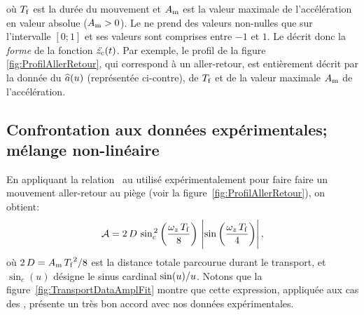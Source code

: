 où ${T_{\rm f}}$ est la durée du mouvement et $A_{\rm m}$ est la valeur maximale de l'accélération en valeur absolue ($A_{\rm m}>0$). 
\noindent Le \paccn ne prend des valeurs non-nulles que sur l'intervalle $[0;1]$ et ses valeurs sont comprises entre $-1$ et $1$.
Le \paccn décrit donc la \emph{forme} de la fonction ${{\ddot{{z_{\rm c}}}}(t)}$. Par exemple, le profil de la figure \vref{fig:ProfilAllerRetour}, qui correspond à un aller-retour, est entièrement décrit par la donnée du \pn ${{\widehat{a}}({u})}$ (représentée ci-contre), de ${T_{\rm f}}$ et de la valeur maximale $A_{\rm m}$ de l'accélération.
%

\subsection{Confrontation aux données expérimentales; mélange non-linéaire}\label{sec:MelangeNonLineaire}
En appliquant la relation~ au \pacc utilisé expérimentalement pour faire faire un mouvement aller-retour au piège (voir la figure~\vref{fig:ProfilAllerRetour}), on obtient:
\begin{equation}
	\Aosc = 2\,\DistZc
	\,\sin_c^{\,2}\left(\frac{\PulsLong\,\tfin}{8}\right)
	\,\Module{\sin\left(\frac{\PulsLong\,\tfin}{4}\right)}
	\virguleformule
	\label{eq:AoscProfilAllerRetour}
\end{equation}
où $2\,{D} = A_{\rm m}\,{{{T_{\rm f}}^2} / {8}}$ est la distance totale parcourue durant le transport, et $\sin_c(u)$ désigne le sinus cardinal ${{\sin(u)} / {u}}$.
Notons que la figure~\vref{fig:TransportDataAmplFit} montre que cette expression, appliquée aux cas des \confab, présente un très bon accord avec nos données expérimentales.  


